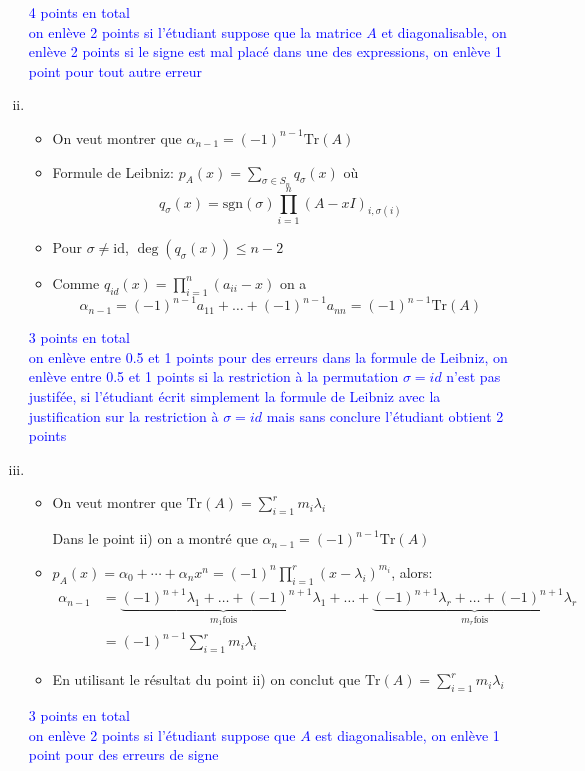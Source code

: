\documentclass[11pt, a4paper, oneside]{article}
\newcommand{\indice}[1]{{\scriptsize \color{RubineRed} {#1}}}
\begin{document}
\begin{enumerate}[i)]
\begin{itemize}
\end{itemize}
\textcolor{blue}{4 points en total \\ on enlève 2 points si l'étudiant suppose que la matrice $A$ et diagonalisable, on enlève 2 points si le signe est mal placé dans une des expressions, on enlève 1 point pour tout autre erreur}

\item
  \begin{itemize}
    \item 
  On veut montrer que $\alpha_{n-1} = (-1)^{n-1}\text{Tr}(A)$ 
\item Formule de Leibniz: $ p_A(x) = \sum_{\sigma \in S_n} q_{\sigma}(x)$ où
  \begin{displaymath}
      q_{\sigma}(x) = \text{sgn}(\sigma)\prod_{i=1}^n(A-xI)_{i,\sigma(i)}
  \end{displaymath}
 
\item Pour $σ ≠ \mathrm{id}$, $\deg(q_{\sigma}(x)) ≤ n-2$
\item  Comme $q_{id}(x) = \prod_{i=1}^n(a_{ii}-x)$ on a  $$\alpha_{n-1} = (-1)^{n-1}a_{11} + \ldots + (-1)^{n-1}a_{nn} = (-1)^{n-1}\text{Tr}(A)$$
\end{itemize} 
\textcolor{blue}{3 points en total \\ on enlève entre 0.5 et 1 points pour des erreurs dans la formule de Leibniz, on enlève entre 0.5 et 1 points si la restriction à la permutation $\sigma = id$ n'est pas justifée, si l'étudiant écrit simplement la formule de Leibniz avec la justification sur la restriction à $\sigma = id$ mais sans conclure l'étudiant obtient 2 points}

\item
  \begin{itemize}
  \item 
On veut montrer que $\text{Tr}(A) = \sum_{i=1}^r m_i\lambda_i$  

\indice {Dans le point ii) on a montré que $\alpha_{n-1} = (-1)^{n-1}\text{Tr}(A)$}
\item $p_A(x) = α_0+ \cdots  + α_n x^n =   (-1)^n \prod_{i=1}^r (x-\lambda_i)^{m_i}$, alors: 
\begin{align*}
\alpha_{n-1} &= \underbrace{(-1)^{n+1}\lambda_1 + \ldots + (-1)^{n+1}\lambda_1}_{m_1 \text{fois}} + \ldots + \underbrace{(-1)^{n+1}\lambda_r + \ldots + (-1)^{n+1}\lambda_r}_{m_r \text{fois}} \\
&= (-1)^{n-1} \sum_{i=1}^r m_i\lambda_i
\end{align*}
\item
En utilisant le résultat du point ii) on conclut que $\text{Tr}(A) = \sum_{i=1}^r m_i\lambda_i$ \\ 
\end{itemize}
\textcolor{blue}{3 points en total \\ on enlève 2 points si l'étudiant suppose que $A$ est diagonalisable, on enlève 1 point pour des erreurs de signe} 
\end{enumerate}
\end{document}
